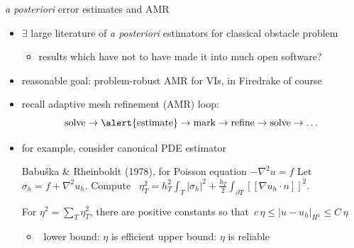 \documentclass[aspectratio=169,10pt]{beamer}
\newcommand{\grad}{\nabla}
\newcommand{\lc}{{\text{\large $\circ$}}}
\begin{document}
\begin{frame}{\emph{a posteriori} error estimates and AMR}

\begin{itemize}
\item $\exists$ large literature of \alert{\emph{a posteriori} estimators} for classical obstacle problem
    \begin{itemize}
    \item[$\lc$] results which have not to have made it into much open software?
    \end{itemize}
\item reasonable goal: problem-robust AMR for VIs, in Firedrake of course

\pause
\medskip
\item recall \alert{adaptive mesh refinement (AMR)} loop:
    $$\text{solve} \to \alert{\text{estimate}} \to \text{mark} \to \text{refine} \to \text{solve} \to \dots$$

\pause
\item for example, consider canonical PDE estimator

\begin{block}{Babu\v{s}ka \& Rheinboldt (1978), for Poisson equation $-\grad^2 u = f$}
Let $\sigma_h=f+\grad^2 u_h$.  Compute \, $\displaystyle \eta_T^2 = h_T^2 \int_T |\sigma_h|^2 + \frac{h_T}{2} \int_{\partial T} \left[\!\left[ \grad u_h\cdot n \right]\!\right]^2$.

For $\eta^2 = \sum_T \eta_T^2$, there are positive constants so that \,\alert{$c\,\eta \le |u-u_h|_{H^1} \le C\, \eta$}
\end{block}
    \begin{itemize}
    \item[$\lc$] \, lower bound: $\eta$ is \alert{efficient} \quad upper bound: $\eta$ is \alert{reliable}
    \end{itemize}
\end{itemize}
\end{frame}
\end{document}
